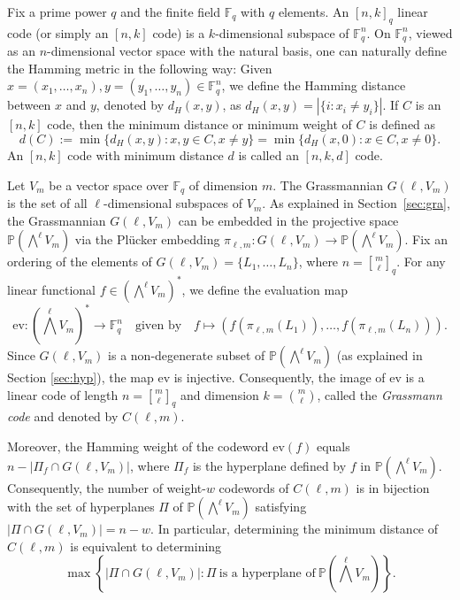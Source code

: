 \documentclass[10pt,a4paper,oneside]{amsproc}
\newcommand{\Fq}{\mathbb{F}_q}
\def\Fq{{\mathbb F}_q}
\def\PP{{\mathbb P}}
\begin{document}
Fix a prime power $q$ and the finite field $\Fq$ with $q$ elements. 
An $[n, k]_q$ linear code (or simply an $[n, k]$ code) is a 
$k$-dimensional subspace of $\Fq^n$. On $\Fq^n$, viewed as an 
$n$-dimensional vector space with the natural basis, one can 
naturally define the Hamming metric in the following way: Given 
$x = (x_1, \dots, x_n), y = (y_1, \dots, y_n) \in \Fq^n$, we 
define the Hamming distance between $x$ and $y$, denoted by 
$d_H(x, y)$, as $d_H(x, y) = |\{i : x_i \neq y_i\}|$. If $C$ 
is an $[n, k]$ code, then the minimum distance or minimum weight 
of $C$ is defined as
$$d(C) := \min\{d_H(x, y) : x, y \in C, x \neq y\} = 
\min\{d_H(x, 0) : x \in C, x \neq 0\}.$$
An $[n, k]$ code with minimum distance $d$ is called an $[n, k, d]$ 
code.

Let $V_m$ be a vector space over $\Fq$ of dimension $m$. The 
Grassmannian $G(\ell, V_m)$ is the set of all $\ell$-dimensional 
subspaces of $V_m$. As explained in Section~\ref{sec:gra}, the 
Grassmannian $G(\ell, V_m)$ can be embedded in the projective space 
$\PP(\bigwedge^\ell V_m)$ via the Pl\"ucker embedding 
$\pi_{\ell,m}: G(\ell, V_m) \to \PP(\bigwedge^\ell V_m)$. 
Fix an ordering of the elements of $G(\ell, V_m) = 
\{L_1, \ldots, L_n\}$, where $n = {{m} \brack{\ell}}_q$. 
For any linear functional $f \in \left(\bigwedge^\ell V_m\right)^*$, 
we define the evaluation map
$$\mathrm{ev}: \left(\bigwedge^\ell V_m\right)^* \to \Fq^n 
\quad \text{given by} \quad 
f \mapsto \left(f(\pi_{\ell,m}(L_1)), \ldots, 
f(\pi_{\ell,m}(L_n))\right).$$
Since $G(\ell, V_m)$ is a non-degenerate subset of 
$\PP(\bigwedge^\ell V_m)$ (as explained in 
Section \ref{sec:hyp}), the map $\mathrm{ev}$ is injective.
Consequently, the image of $\mathrm{ev}$ is a linear code of length 
$n = {m \brack \ell}_q$ and dimension $k = \binom{m}{\ell}$, 
called the \emph{Grassmann code} and denoted by $C(\ell, m)$. 

 
Moreover, the Hamming weight of the codeword $\mathrm{ev}(f)$ equals 
$n - |\Pi_f \cap G(\ell, V_m)|$, where $\Pi_f$ is the hyperplane 
defined by $f$ in $\PP(\bigwedge^\ell V_m)$. Consequently, the 
number of weight-$w$ codewords of $C(\ell, m)$ is in bijection 
with the set of hyperplanes $\Pi$ of $\PP(\bigwedge^\ell V_m)$ 
satisfying $|\Pi \cap G(\ell, V_m)| = n - w$. In particular, 
determining the minimum distance of $C(\ell, m)$ is equivalent 
to determining
$$\max\left\{|\Pi \cap G(\ell, V_m)| : \Pi \ \text{is a hyperplane of} 
\ \PP(\bigwedge^\ell V_m)\right\}.$$
\end{document}
